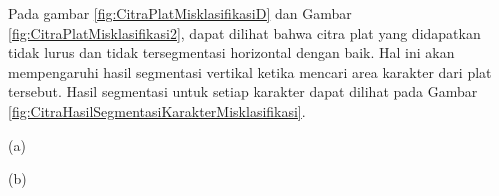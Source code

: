 \begin{adjustbox}{width=1\textwidth}
	\noindent\begin{minipage}{\linewidth}
		\centering{}
		\label{fig:CitraPlatMisklasifikasi2}
	\end{minipage}
\end{adjustbox}

\noindent Pada gambar \ref{fig:CitraPlatMisklasifikasiD} dan Gambar \ref{fig:CitraPlatMisklasifikasi2}, dapat dilihat bahwa citra plat yang didapatkan tidak lurus dan tidak tersegmentasi horizontal dengan baik. Hal ini akan mempengaruhi hasil segmentasi vertikal ketika mencari area karakter dari plat tersebut. Hasil segmentasi untuk setiap karakter dapat dilihat pada Gambar \ref{fig:CitraHasilSegmentasiKarakterMisklasifikasi}.

\begin{adjustbox}{width=1\textwidth}
	\noindent\begin{minipage}{\linewidth}
		\centering{}
		\begin{center}
			(a)
		\end{center}
	\end{minipage}
\end{adjustbox}

\begin{adjustbox}{width=1\textwidth}
	\noindent\begin{minipage}{\linewidth}
		\centering{}
		\begin{center}
			(b)
		\end{center}
	\end{minipage}
\end{adjustbox}

